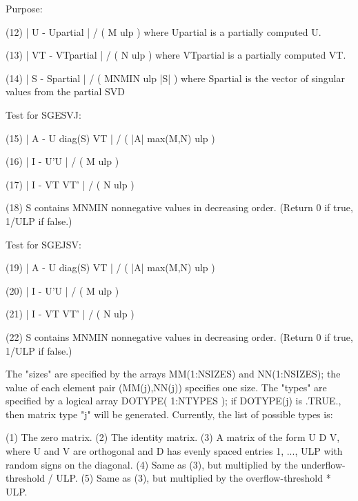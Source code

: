 \begin{DoxyParagraph}{Purpose\+: }
\begin{DoxyVerb}
 (12)   | U - Upartial | / ( M ulp ) where Upartial is a partially
        computed U.

 (13)   | VT - VTpartial | / ( N ulp ) where VTpartial is a partially
        computed VT.

 (14)   | S - Spartial | / ( MNMIN ulp |S| ) where Spartial is the
        vector of singular values from the partial SVD

 Test for SGESVJ:

 (15)    | A - U diag(S) VT | / ( |A| max(M,N) ulp )

 (16)    | I - U'U | / ( M ulp )

 (17)   | I - VT VT' | / ( N ulp )

 (18)   S contains MNMIN nonnegative values in decreasing order.
        (Return 0 if true, 1/ULP if false.)

 Test for SGEJSV:

 (19)    | A - U diag(S) VT | / ( |A| max(M,N) ulp )

 (20)    | I - U'U | / ( M ulp )

 (21)   | I - VT VT' | / ( N ulp )

 (22)   S contains MNMIN nonnegative values in decreasing order.
        (Return 0 if true, 1/ULP if false.)

 The "sizes" are specified by the arrays MM(1:NSIZES) and
 NN(1:NSIZES); the value of each element pair (MM(j),NN(j))
 specifies one size.  The "types" are specified by a logical array
 DOTYPE( 1:NTYPES ); if DOTYPE(j) is .TRUE., then matrix type "j"
 will be generated.
 Currently, the list of possible types is:

 (1)  The zero matrix.
 (2)  The identity matrix.
 (3)  A matrix of the form  U D V, where U and V are orthogonal and
      D has evenly spaced entries 1, ..., ULP with random signs
      on the diagonal.
 (4)  Same as (3), but multiplied by the underflow-threshold / ULP.
 (5)  Same as (3), but multiplied by the overflow-threshold * ULP.\end{DoxyVerb}
 
\end{DoxyParagraph}

